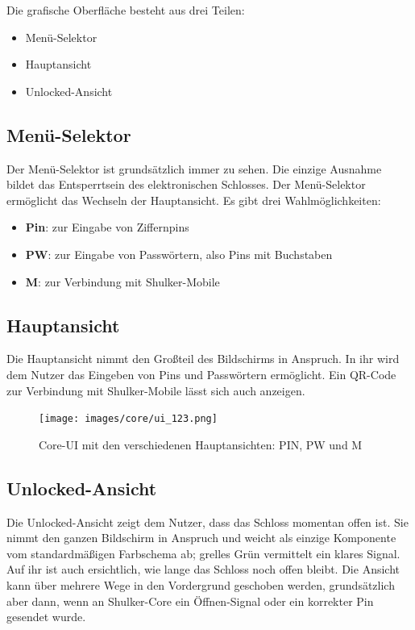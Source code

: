 Die grafische Oberfläche besteht aus drei Teilen:
\begin{itemize}
    \item Menü-Selektor
    \item Hauptansicht
    \item Unlocked-Ansicht
\end{itemize}

\subsection{Menü-Selektor}
Der Menü-Selektor ist grundsätzlich immer zu sehen. Die einzige Ausnahme bildet das Entsperrtsein des elektronischen
Schlosses. Der Menü-Selektor ermöglicht das Wechseln der Hauptansicht. Es gibt drei Wahlmöglichkeiten:
\begin{itemize}
    \item \textbf{Pin}: zur Eingabe von Ziffernpins
    \item \textbf{PW}: zur Eingabe von Passwörtern, also Pins mit Buchstaben
    \item \textbf{M}: zur Verbindung mit Shulker-Mobile
\end{itemize}

\subsection{Hauptansicht}
Die Hauptansicht nimmt den Großteil des Bildschirms in Anspruch. In ihr wird dem Nutzer das Eingeben von Pins und Passwörtern
ermöglicht. Ein QR-Code zur Verbindung mit Shulker-Mobile lässt sich auch anzeigen.

\begin{figure}[H]
    \begin{center}
        \texttt{[image: images/core/ui\_123.png]}
        \caption{Core-UI mit den verschiedenen Hauptansichten: PIN, PW und M}
    \end{center}
\end{figure}

\subsection{Unlocked-Ansicht}
Die Unlocked-Ansicht zeigt dem Nutzer, dass das Schloss momentan offen ist. Sie nimmt den ganzen Bildschirm in Anspruch und weicht
als einzige Komponente vom standardmäßigen Farbschema ab; grelles Grün vermittelt ein klares Signal. Auf ihr ist auch ersichtlich,
wie lange das Schloss noch offen bleibt. Die Ansicht kann über mehrere Wege in den Vordergrund geschoben werden, grundsätzlich aber dann,
wenn an Shulker-Core ein Öffnen-Signal oder ein korrekter Pin gesendet wurde.

